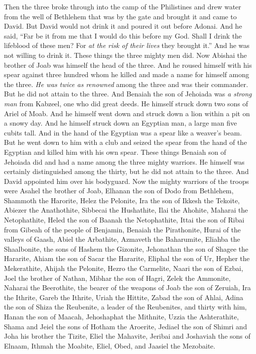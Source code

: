 \begin{biblechapter}
\verse Then the three broke through into the camp of the Philistines and drew water from the well of Bethlehem that was by the gate and brought it and came to David. But David would not drink it and poured it out before Adonai.
\verse And he said, “Far be it from me that I would do this before my God. Shall I drink the lifeblood of these men? For \textit{at the risk of their lives} they brought it.” And he was not willing to drink it. These things the three mighty men did.
\verse Now Abishai the brother of Joab was himself the head of the three. And he roused himself with his spear against three hundred whom he killed and made a name for himself among the three.
\verse \textit{He was twice as renowned} among the three and was their commander. But he did not attain to the three.
\verse And Benaiah the son of Jehoiada was \textit{a strong man} from Kabzeel, one who did great deeds. He himself struck down two sons of Ariel of Moab. And he himself went down and struck down a lion within a pit on a snowy day.
\verse And he himself struck down an Egyptian man, a large man five cubits tall. And in the hand of the Egyptian was a spear like a weaver’s beam. But he went down to him with a club and seized the spear from the hand of the Egyptian and killed him with his own spear.
\verse These things Benaiah son of Jehoiada did and had a name among the three mighty warriors.
\verse He himself was certainly distinguished among the thirty, but he did not attain to the three. And David appointed him over his bodyguard.
\verse Now the mighty warriors of the troops were Asahel the brother of Joab, Elhanan the son of Dodo from Bethlehem,
\verse Shammoth the Harorite, Helez the Pelonite,
\verse Ira the son of Ikkesh the Tekoite, Abiezer the Anathothite,
\verse Sibbecai the Hushathite, Ilai the Ahohite,
\verse Maharai the Netophathite, Heled the son of Baanah the Netophathite,
\verse Ittai the son of Ribai from Gibeah of the people of Benjamin, Benaiah the Pirathonite,
\verse Hurai of the valleys of Gaash, Abiel the Arbathite,
\verse Azmaveth the Baharumite, Eliahba the Shaalbonite,
\verse the sons of Hashem the Gizonite, Jehonathan the son of Shagee the Hararite,
\verse Ahiam the son of Sacar the Hararite, Eliphal the son of Ur,
\verse Hepher the Mekerathite, Ahijah the Pelonite,
\verse Hezro the Carmelite, Naari the son of Ezbai,
\verse Joel the brother of Nathan, Mibhar the son of Hagri,
\verse Zelek the Ammonite, Naharai the Beerothite, the bearer of the weapons of Joab the son of Zeruiah,
\verse Ira the Ithrite, Gareb the Ithrite,
\verse Uriah the Hittite, Zabad the son of Ahlai,
\verse Adina the son of Shiza the Reubenite, a leader of the Reubenites, and thirty with him,
\verse Hanan the son of Maacah, Jehoshaphat the Mithnite,
\verse Uzzia the Ashterathite, Shama and Jeiel the sons of Hotham the Aroerite,
\verse Jediael the son of Shimri and Joha his brother the Tizite,
\verse Eliel the Mahavite, Jeribai and Joshaviah the sons of Elnaam, Ithmah the Moabite,
\verse Eliel, Obed, and Jaasiel the Mezobaite.
\end{biblechapter}

